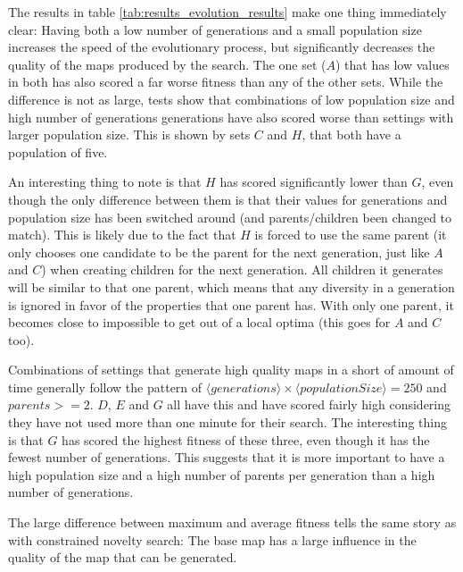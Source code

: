 The results in table \ref{tab:results_evolution_results} make one thing immediately clear: Having both a low number of generations and a small population size increases the speed of the evolutionary process, but significantly decreases the quality of the maps produced by the search. The one set ($A$) that has low values in both has also scored a far worse fitness than any of the other sets. While the difference is not as large, tests show that combinations of low population size and high number of generations generations have also scored worse than settings with larger population size. This is shown by sets $C$ and $H$, that both have a population of five.

An interesting thing to note is that $H$ has scored significantly lower than $G$, even though the only difference between them is that their values for generations and population size has been switched around (and parents/children been changed to match). This is likely due to the fact that $H$ is forced to use the same parent (it only chooses one candidate to be the parent for the next generation, just like $A$ and $C$) when creating children for the next generation. All children it generates will be similar to that one parent, which means that any diversity in a generation is ignored in favor of the properties that one parent has. With only one parent, it becomes close to impossible to get out of a local optima (this goes for $A$ and $C$ too).

Combinations of settings that generate high quality maps in a short of amount of time generally follow the pattern of $\langle generations \rangle \times \langle populationSize \rangle = 250$ and$parents >= 2$. $D$, $E$ and $G$ all have this and have scored fairly high considering they have not used more than one minute for their search. The interesting thing is that $G$ has scored the highest fitness of these three, even though it has the fewest number of generations. This suggests that it is more important to have a high population size and a high number of parents per generation than a high number of generations.

The large difference between maximum and average fitness tells the same story as with constrained novelty search: The base map has a large influence in the quality of the map that can be generated.

